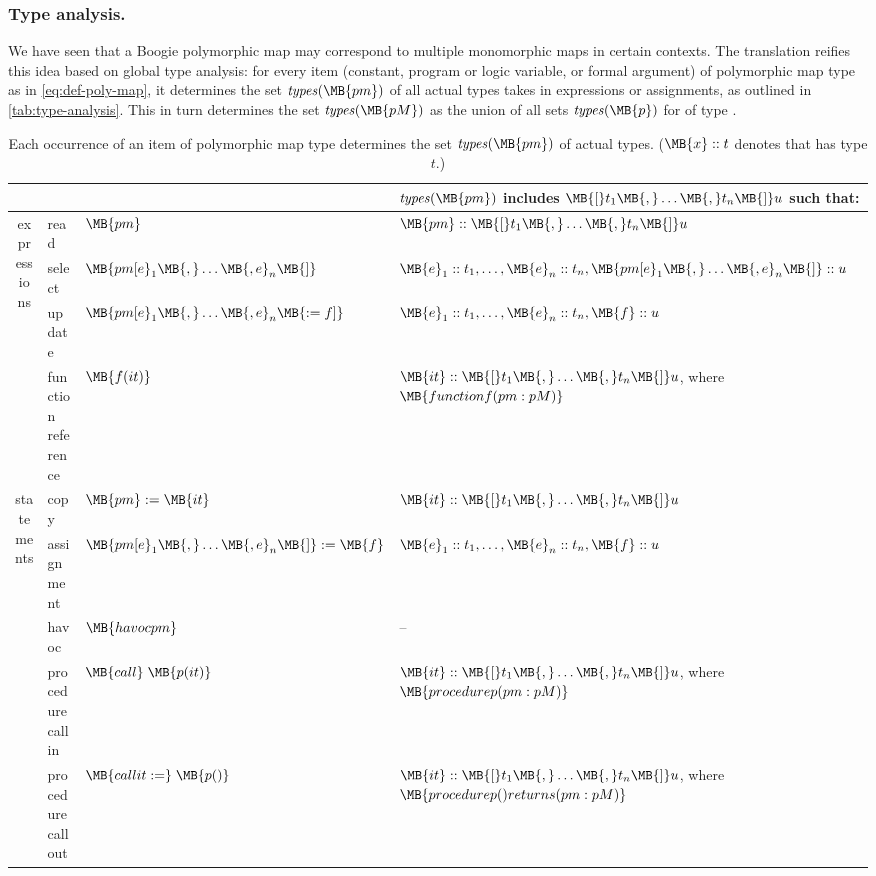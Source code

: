 \documentclass[a4paper,final]{llncs}
\newif\iflong
\newcommand{\Boogie}{Boogie\xspace}
\newcommand{\typesOf}[1]{\mathit{types}(\MB{#1})}
\begin{document}
\subsubsection{Type analysis.}
We have seen that a \Boogie polymorphic map may correspond to multiple monomorphic maps in certain contexts.
The translation reifies this idea based on global type analysis: for every item (constant, program or logic variable, or formal argument)  of polymorphic map type  as in \eqref{eq:def-poly-map}, it determines the set $\typesOf{pm}$ of all actual types  takes in expressions or assignments, as outlined in \autoref{tab:type-analysis}.\iflong\footnote{A parameter's actual type is ambiguous if the parameter appears in the map type's codomain but not in its domain; in this case, \Boogie defaults to type \B{int}.}\fi{} 
This in turn determines the set $\typesOf{pM}$ as the union of all sets $\typesOf{p}$ for  of type .

\begin{table}[!hbt]
\setlength{\tabcolsep}{2pt}
\centering
\scriptsize
\begin{tabular}{clll}
& &  &  $\typesOf{pm}$ includes $\MB{[}t_1\MB{,} \ldots\MB{,} t_n\MB{]}u$ such that: \\
\hline
\multirow{4}{*}{expressions} 
& read   &  $\MB{pm}$  & $\MB{pm} :: \MB{[}t_1\MB{,} \ldots\MB{,} t_n\MB{]}u$ \\
& select &  $\MB{pm[e}_1\MB{,}\ldots\MB{,e}_n\MB{]}$ & $\MB{e}_1 :: t_1, \ldots, \MB{e}_n :: t_n, \MB{pm[e}_1\MB{,}\ldots\MB{,e}_n\MB{]} :: u$ \\
& update & $\MB{pm[e}_1\MB{,}\ldots\MB{,e}_n\MB{:= f]}$ & $\MB{e}_1 :: t_1, \ldots, \MB{e}_n :: t_n, \MB{f} :: u$ \\
& function reference &  $\MB{f(it)}$ & $\MB{it} :: \MB{[}t_1\MB{,} \ldots\MB{,} t_n\MB{]}u$, where $\MB{function f(pm: pM)}$ \\
\cline{2-4}
\multirow{5}{*}{statements} 
& copy & $\MB{pm} := \MB{it}$ &  $\MB{it} :: \MB{[}t_1\MB{,} \ldots\MB{,} t_n\MB{]}u$  \\
& assignment & $\MB{pm[e}_1\MB{,}\ldots\MB{,e}_n\MB{]} := \MB{f}$ & $\MB{e}_1 :: t_1, \ldots, \MB{e}_n :: t_n, \MB{f} :: u$ \\
& havoc & $\MB{havoc pm}$ & -- \\
& procedure call in &  $\MB{call}\;\MB{p(it)}$ & $\MB{it} :: \MB{[}t_1\MB{,} \ldots\MB{,} t_n\MB{]}u$, where $\MB{procedure p(pm: pM)}$ \\
& procedure call out &  $\MB{call it :=}\;\MB{p()}$ & $\MB{it} :: \MB{[}t_1\MB{,} \ldots\MB{,} t_n\MB{]}u$, where $\MB{procedure p() returns(pm: pM)}$
\end{tabular}
\caption{Each occurrence of an item  of polymorphic map type  determines the set $\typesOf{pm}$ of actual types. ($\MB{x} :: t$ denotes that  has type $t$.)}
\label{tab:type-analysis}
\end{table}
\end{document}

